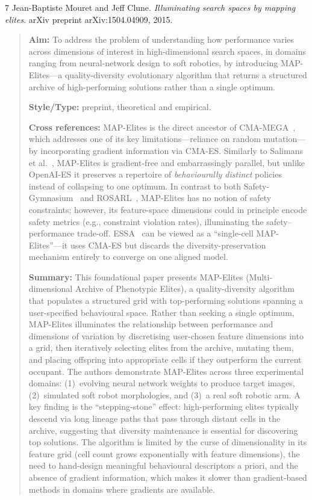 \documentclass[12pt, a4paper]{article}
\begin{document}
\begin{thebibliography}{7}
Jean-Baptiste Mouret and Jeff Clune.
\textit{Illuminating search spaces by mapping elites}.
arXiv preprint arXiv:1504.04909, 2015.

\begin{quotation}
\noindent
\textbf{Aim:} To address the problem of understanding how performance varies across dimensions of interest in high-dimensional search spaces, in domains ranging from neural-network design to soft robotics, by introducing MAP-Elites---a quality-diversity evolutionary algorithm that returns a structured archive of high-performing solutions rather than a single optimum.

\textbf{Style/Type:} preprint, theoretical and empirical.

\textbf{Cross references:} MAP-Elites is the direct ancestor of CMA-MEGA~\cite{tjanaka2022approximating}, which addresses one of its key limitations---reliance on random mutation---by incorporating gradient information via CMA-ES. Similarly to Salimans et al.~\cite{salimans2017evolution}, MAP-Elites is gradient-free and embarrassingly parallel, but unlike OpenAI-ES it preserves a repertoire of \emph{behaviourally distinct} policies instead of collapsing to one optimum. In contrast to both Safety-Gymnasium~\cite{ji2023safety} and ROSARL~\cite{nanguetasse2024rosarl}, MAP-Elites has no notion of safety constraints; however, its feature-space dimensions could in principle encode safety metrics (e.g., constraint violation rates), illuminating the safety--performance trade-off. ESSA~\cite{korotyshova2025essa} can be viewed as a ``single-cell MAP-Elites''---it uses CMA-ES but discards the diversity-preservation mechanism entirely to converge on one aligned model.

\textbf{Summary:} This foundational paper presents MAP-Elites (Multi-dimensional Archive of Phenotypic Elites), a quality-diversity algorithm that populates a structured grid with top-performing solutions spanning a user-specified behavioural space. Rather than seeking a single optimum, MAP-Elites illuminates the relationship between performance and dimensions of variation by discretising user-chosen feature dimensions into a grid, then iteratively selecting elites from the archive, mutating them, and placing offspring into appropriate cells if they outperform the current occupant. The authors demonstrate MAP-Elites across three experimental domains: (1)~evolving neural network weights to produce target images, (2)~simulated soft robot morphologies, and (3)~a real soft robotic arm. A key finding is the ``stepping-stone'' effect: high-performing elites typically descend via long lineage paths that pass through distant cells in the archive, suggesting that diversity maintenance is essential for discovering top solutions. The algorithm is limited by the curse of dimensionality in its feature grid (cell count grows exponentially with feature dimensions), the need to hand-design meaningful behavioural descriptors a priori, and the absence of gradient information, which makes it slower than gradient-based methods in domains where gradients are available.
\end{quotation}


\end{thebibliography}
\end{document}
